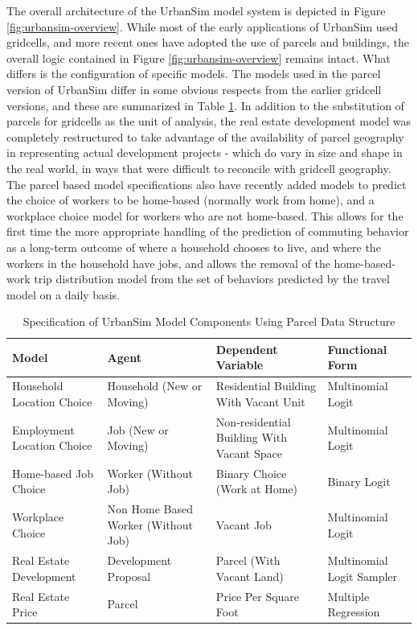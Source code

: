 The overall architecture of the UrbanSim model system is depicted in Figure \ref{fig:urbansim-overview}.  While most of the early applications of UrbanSim used gridcells, and more recent ones have adopted the use of parcels and buildings, the overall logic contained in Figure \ref{fig:urbansim-overview} remains intact.  What differs is the configuration of specific models.
The models used in the parcel version of UrbanSim differ in some obvious respects from the earlier gridcell versions, and these are summarized in Table \ref{tab:components-parcel}.  In addition to the substitution of parcels for gridcells as the unit of analysis, the real estate development model was completely restructured to take advantage of the availability of parcel geography in representing actual development projects - which do vary in size and shape in the real world, in ways that were difficult to reconcile with gridcell geography.  The parcel based model specifications also have recently added models to predict the choice of workers to be home-based (normally work from home), and a workplace choice model for workers who are not home-based.  This allows for the first time the more appropriate handling of the prediction of commuting behavior as a long-term outcome of where a household chooses to live, and where the workers in the household have jobs, and allows the removal of the home-based-work trip distribution model from the set of behaviors predicted by the travel model on a daily basis.

\begin{table}[htp]
\caption{Specification of UrbanSim Model Components Using Parcel Data Structure}
\label{tab:components-parcel}
\begin{tabular}{p{4.5cm} p{3.4cm}p{3.4cm}p{3.3cm}}
\toprule[1.5pt]
Model & Agent & Dependent Variable & Functional Form \\
\midrule
Household Location Choice & Household (New or Moving) & Residential Building With Vacant Unit & Multinomial Logit \\
\midrule
Employment Location Choice & Job (New or Moving) & Non-residential Building With Vacant Space & Multinomial Logit \\
\midrule
Home-based Job Choice & Worker (Without Job) & Binary Choice (Work at Home) & Binary Logit \\
\midrule
Workplace Choice & Non Home Based Worker (Without Job) & Vacant Job & Multinomial Logit \\
\midrule
Real Estate Development  & Development Proposal & Parcel (With Vacant Land) & Multinomial Logit Sampler \\
\midrule
Real Estate Price & Parcel & Price Per Square Foot & Multiple Regression \\
\bottomrule[1.5pt]
\end{tabular}
\end{table}



